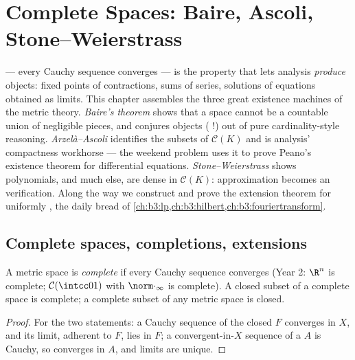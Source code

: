 \chapter{Complete Spaces: Baire, Ascoli, Stone--Weierstrass}
\label{ch:b3:complete}

 --- every Cauchy sequence converges --- is the
property that lets analysis \emph{produce} objects: fixed points
of contractions, sums of series, solutions of equations obtained
as limits. This chapter assembles the three great existence
machines of the metric theory. \emph{Baire's theorem} shows that
a  space cannot be a countable union of negligible
pieces, and conjures objects ( !) out of pure cardinality-style reasoning.
\emph{Arzel\`a--Ascoli} identifies the  subsets of
$\mathcal C(K)$ and is analysis' compactness workhorse --- the
weekend problem uses it to prove Peano's existence theorem for
differential equations. \emph{Stone--Weierstrass} shows
polynomials, and much else, are dense in $\mathcal C(K)$:
approximation becomes an  verification. Along the way we
construct  and prove the extension theorem for
uniformly , the daily bread of
\cref{ch:b3:lp,ch:b3:hilbert,ch:b3:fouriertransform}.

\section{Complete spaces, completions, extensions}

\begin{definition}\label{def:b3:complete:complete}
A metric space is \emph{complete} if
every Cauchy sequence converges (Year 2: $\R^n$ is complete;
$\mathcal C(\intcc01)$ with $\norm\cdot_\infty$ is complete). A
closed subset of a complete space is complete; a complete subset
of any metric space is closed.
\end{definition}

\begin{proof}
For the two statements: a Cauchy sequence of the closed $F$
converges in $X$, and its limit, adherent to $F$, lies in $F$; a
convergent-in-$X$ sequence of a  $A$ is Cauchy, so
converges in $A$, and limits are unique.
\end{proof}

